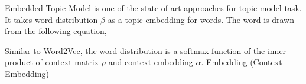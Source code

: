 Embedded Topic Model is one of the state-of-art approaches for topic model task. It takes word distribution $ \beta $ as a topic embedding for words. The word is drawn from the following equation,

Similar to Word2Vec, the word distribution is a softmax function of the inner product of context matrix $ \rho $ and context embedding $ \alpha $.
Embedding (Context Embedding)
